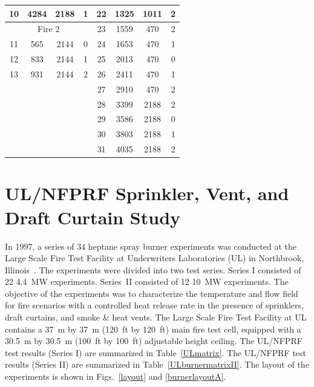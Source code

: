 \begin{table}[h!]
\begin{center}
\begin{tabular}{|c|c|c|c||c|c|c|c|}
10      & 4284      & 2188          & 1         & 22      & 1325      & 1011          & 2                 \\ \hline
\multicolumn{4}{|c||}{Fire 2}                   & 23      & 1559      & 470           & 2                 \\ \hline
11      & 565       & 2144          & 0         & 24      & 1653      & 470           & 1                 \\ \hline
12      & 833       & 2144          & 1         & 25      & 2013      & 470           & 0                 \\ \hline
13      & 931       & 2144          & 2         & 26      & 2411      & 470           & 1                 \\ \hline
\multicolumn{4}{|r||}{}                         & 27      & 2910      & 470           & 2                 \\ \cline{5-8}
\multicolumn{4}{|r||}{}                         & 28      & 3399      & 2188          & 2                 \\ \cline{5-8}
\multicolumn{4}{|r||}{}                         & 29      & 3586      & 2188          & 0                 \\ \cline{5-8}
\multicolumn{4}{|r||}{}                         & 30      & 3803      & 2188          & 1                 \\ \cline{5-8}
\multicolumn{4}{|r||}{}                         & 31      & 4035      & 2188          & 2                 \\ \hline
\end{tabular}
\end{center}
\label{UL_NIST_Table}
\end{table}


\clearpage

\section{UL/NFPRF Sprinkler, Vent, and Draft Curtain Study}
\label{UL_NFPRF_Description}

In 1997, a series of 34 heptane spray burner experiments was conducted at the Large Scale Fire Test Facility at Underwriters Laboratories
(UL) in Northbrook, Illinois~\cite{Sheppard:1,McGrattan:5}. The experiments were divided into two test series. Series I consisted of 22 4.4~MW experiments. Series~II consisted
of 12 10~MW experiments. The objective of the experiments was to characterize the temperature and flow field for fire
scenarios with a controlled heat release rate in the presence of sprinklers, draft curtains, and smoke \& heat vents.
The Large Scale Fire Test Facility at UL contains a 37~m by 37~m (120~ft by 120~ft) main fire test cell, equipped with a 30.5~m by 30.5~m (100~ft by
100~ft) adjustable height ceiling. The UL/NFPRF test results (Series I) are summarized in Table~\ref{ULmatrix}. The UL/NFPRF test results (Series II) are summarized in Table~\ref{ULburnermatrixII}. The layout of the experiments is shown in Figs.~\ref{layout} and \ref{burnerlayoutA}.


